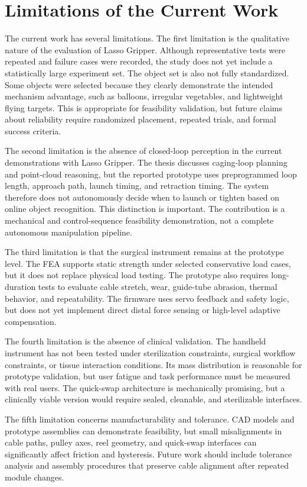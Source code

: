 \section{Limitations of the Current Work}

The current work has several limitations. The first limitation is the qualitative nature of the evaluation of Lasso Gripper. Although representative tests were repeated and failure cases were recorded, the study does not yet include a statistically large experiment set. The object set is also not fully standardized. Some objects were selected because they clearly demonstrate the intended mechanism advantage, such as balloons, irregular vegetables, and lightweight flying targets. This is appropriate for feasibility validation, but future claims about reliability require randomized placement, repeated trials, and formal success criteria.

The second limitation is the absence of closed-loop perception in the current demonstrations with Lasso Gripper. The thesis discusses caging-loop planning and point-cloud reasoning, but the reported prototype uses preprogrammed loop length, approach path, launch timing, and retraction timing. The system therefore does not autonomously decide when to launch or tighten based on online object recognition. This distinction is important. The contribution is a mechanical and control-sequence feasibility demonstration, not a complete autonomous manipulation pipeline.

The third limitation is that the surgical instrument remains at the prototype level. The FEA supports static strength under selected conservative load cases, but it does not replace physical load testing. The prototype also requires long-duration tests to evaluate cable stretch, wear, guide-tube abrasion, thermal behavior, and repeatability. The firmware uses servo feedback and safety logic, but does not yet implement direct distal force sensing or high-level adaptive compensation.

The fourth limitation is the absence of clinical validation. The handheld instrument has not been tested under sterilization constraints, surgical workflow constraints, or tissue interaction conditions. Its mass distribution is reasonable for prototype validation, but user fatigue and task performance must be measured with real users. The quick-swap architecture is mechanically promising, but a clinically viable version would require sealed, cleanable, and sterilizable interfaces.

The fifth limitation concerns manufacturability and tolerance. CAD models and prototype assemblies can demonstrate feasibility, but small misalignments in cable paths, pulley axes, reel geometry, and quick-swap interfaces can significantly affect friction and hysteresis. Future work should include tolerance analysis and assembly procedures that preserve cable alignment after repeated module changes.

